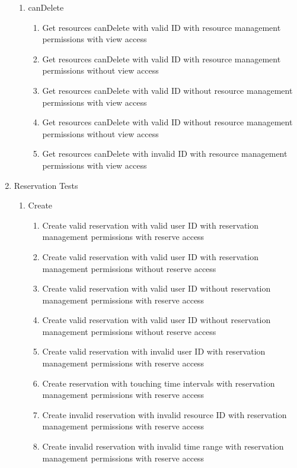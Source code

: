 \documentclass[12pt]{article}
\begin{document}
\begin{enumerate}
\begin{enumerate}
        \item canDelete
            \begin{enumerate}
            \item Get resources canDelete with valid ID with resource management permissions with view access
            \item Get resources canDelete with valid ID with resource management permissions without view access
            \item Get resources canDelete with valid ID without resource management permissions with view access
            \item Get resources canDelete with valid ID without resource management permissions without view access
            \item Get resources canDelete with invalid ID with resource management permissions with view access
            \end{enumerate}
    \end{enumerate}
    \item Reservation Tests
    \begin{enumerate}
        \item Create
        \begin{enumerate}
            \item Create valid reservation with valid user ID with reservation management permissions with reserve access
            \item Create valid reservation with valid user ID with reservation management permissions without reserve access
            \item Create valid reservation with valid user ID without reservation management permissions with reserve access
            \item Create valid reservation with valid user ID without reservation management permissions without reserve access
            \item Create valid reservation with invalid user ID with reservation management permissions with reserve access
            \item Create reservation with touching time intervals with reservation management permissions with reserve access
            \item Create invalid reservation with invalid resource ID with reservation management permissions with reserve access
            \item Create invalid reservation with invalid time range with reservation management permissions with reserve access    

\end{enumerate}
\end{enumerate}
\end{enumerate}
\end{document}
